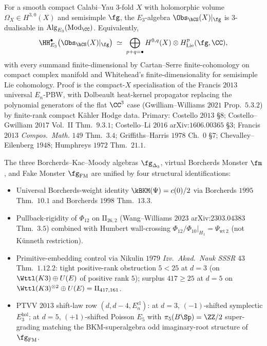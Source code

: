 \begin{theorem}
\label{wn:thm:wave3-compact-3dual}\ClaimStatusTheorem
For a smooth compact Calabi--Yau $3$-fold $X$ with holomorphic volume
$\Omega_X \in H^{3,0}(X)$ and semisimple $\fg$, the $E_3$-algebra
$\Obs_{\hCS}(X)|_{\fg}$ is $3$-dualisable in
$\mathrm{Alg}_{E_3}(\mathrm{Mod}_{\CC})$. Equivalently,
\[
\HH^{\bullet}_{E_3}\bigl(\Obs_{\hCS}(X)|_{\fg}\bigr)
\;\simeq\;
\bigoplus_{p + q = \bullet} H^{0,q}(X)\otimes H^p_{\mathrm{Lie}}(\fg, \CC),
\]
with every summand finite-dimensional by Cartan--Serre finite-cohomology
on compact complex manifold and Whitehead's finite-dimensionality for
semisimple Lie cohomology. Proof is the compact-$X$ specialisation of
the Francis $2013$ universal $E_n$-PBW, with Dolbeault heat-kernel
propagator replacing the polynomial generators of the flat $\CC^3$
case (Gwilliam--Williams $2021$ Prop.~$5.3.2$) by finite-rank compact
K\"ahler Hodge data. Primary: Costello $2013$ \S$8$;
Costello--Gwilliam $2017$ Vol.~II Thm.~$9.3.1$;
Costello--Li $2016$ arXiv:$1606.00365$ \S$3$;
Francis $2013$ \emph{Compos.~Math.} $149$ Thm.~$3.4$;
Griffiths--Harris $1978$ Ch.~$0$ \S$7$;
Chevalley--Eilenberg $1948$; Humphreys $1972$ Thm.~$21.1$.
\end{theorem}

\begin{theorem}
\label{wn:thm:wave3-dim-stratified-census}\ClaimStatusTheorem
The three Borcherds--Kac--Moody algebras $\fg_{\Delta_5}$, virtual
Borcherds Monster $\fm$, and Fake Monster $\fg_{\mathrm{FM}}$ are
unified by four structural identifications:

\begin{itemize}
\item[\textup{(U$1$)}] Universal Borcherds-weight identity
$\kBKM(\Psi) = c(0)/2$ via Borcherds $1995$ Thm.~$10.1$ and Borcherds
$1998$ Thm.~$13.3$.
\item[\textup{(U$2$)}] Pullback-rigidity of $\Phi_{12}$ on
$\mathrm{II}_{26,2}$ (Wang--Williams $2023$ arXiv:$2303.04383$
Thm.~$3.5$) combined with Humbert wall-crossing
$\Phi_{12}/\Phi_{10}|_{H_1} = \Psi_{\mathrm{wt}\,2}$ (not K\"unneth
restriction).
\item[\textup{(U$3$)}] Primitive-embedding control via Nikulin $1979$
\emph{Izv.~Akad.~Nauk SSSR} $43$ Thm.~$1.12.2$: tight positive-rank
obstruction $5 < 25$ at $d = 3$ (on $\Wttl(K3) \oplus U(E)$ of
positive rank $5$); surplus $417 \geq 25$ at $d = 5$ on
$\Wttl(K3)^{\otimes 2} \oplus U(E) = \mathrm{II}_{417, 161}$.
\item[\textup{(U$4$)}] PTVV $2013$ shift-law row $(d, d - 4,
E_n^{\mathrm{cl}})$: at $d = 3$, $(-1)$-shifted symplectic
$E_3^{\mathrm{hol}}$; at $d = 5$, $(+1)$-shifted Poisson $E_5$ with
$\pi_5(B\Sp) = \ZZ/2$ super-grading matching the BKM-superalgebra odd
imaginary-root structure of $\fg_{\mathrm{FM}}$.
\end{itemize}
\end{theorem}

